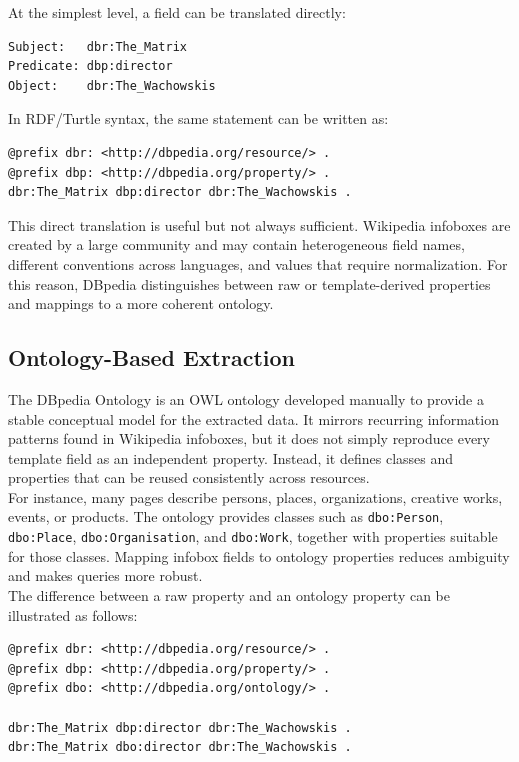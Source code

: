 \documentclass{scrbook}
\begin{document}
	At the simplest level, a field can be translated directly:
	
	\begin{lstlisting}
Subject:   dbr:The_Matrix
Predicate: dbp:director
Object:    dbr:The_Wachowskis
	\end{lstlisting}
	
	In RDF/Turtle syntax, the same statement can be written as:
	
	\begin{lstlisting}
@prefix dbr: <http://dbpedia.org/resource/> .
@prefix dbp: <http://dbpedia.org/property/> .
dbr:The_Matrix dbp:director dbr:The_Wachowskis .
	\end{lstlisting}
	
	This direct translation is useful but not always sufficient. Wikipedia infoboxes are created by a large community and may contain heterogeneous field names, different conventions across languages, and values that require normalization. For this reason, DBpedia distinguishes between raw or template-derived properties and mappings to a more coherent ontology.
	
	\subsection{Ontology-Based Extraction}
	
	The DBpedia Ontology is an OWL ontology developed manually to provide a stable conceptual model for the extracted data. It mirrors recurring information patterns found in Wikipedia infoboxes, but it does not simply reproduce every template field as an independent property. Instead, it defines classes and properties that can be reused consistently across resources.\\
	
	For instance, many pages describe persons, places, organizations, creative works, events, or products. The ontology provides classes such as \texttt{dbo:Person}, \texttt{dbo:Place}, \texttt{dbo:Organisation}, and \texttt{dbo:Work}, together with properties suitable for those classes. Mapping infobox fields to ontology properties reduces ambiguity and makes queries more robust.\\
	
	The difference between a raw property and an ontology property can be illustrated as follows:
	
	\begin{lstlisting}
@prefix dbr: <http://dbpedia.org/resource/> .
@prefix dbp: <http://dbpedia.org/property/> .
@prefix dbo: <http://dbpedia.org/ontology/> .

dbr:The_Matrix dbp:director dbr:The_Wachowskis .
dbr:The_Matrix dbo:director dbr:The_Wachowskis .
	\end{lstlisting}
	
\end{document}
